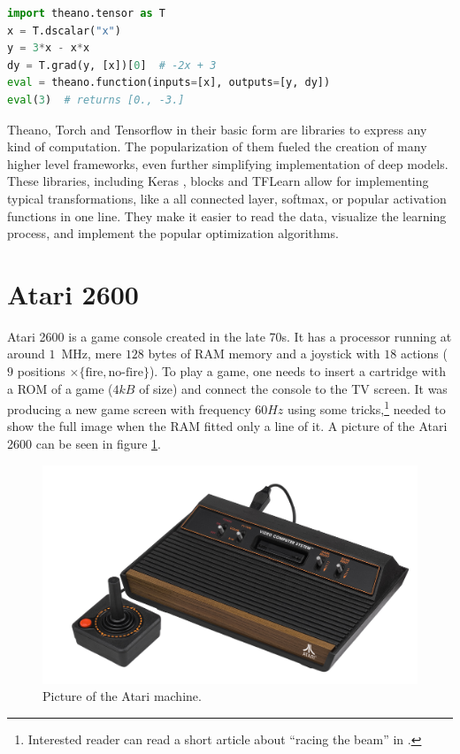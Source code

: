 \begin{lstlisting}[language=Python, caption=Example Theano code.,label={theano-code}
]
import theano.tensor as T
x = T.dscalar("x")
y = 3*x - x*x
dy = T.grad(y, [x])[0]  # -2x + 3
eval = theano.function(inputs=[x], outputs=[y, dy])
eval(3)  # returns [0., -3.]
\end{lstlisting}

Theano, Torch and Tensorflow in their basic form are libraries to express any kind of computation. The popularization of them fueled the creation of many higher level frameworks, even further simplifying implementation of deep models. These libraries, including Keras \cite{keras}, blocks \cite{blocks} and TFLearn \cite{tflearn} allow for implementing typical transformations, like a all connected layer, softmax, or popular activation functions in one line. They make it easier to read the data, visualize the learning process, and implement the popular optimization algorithms.

\section{Atari 2600}
Atari 2600 is a game console created in the late 70s. It has a processor running at around $1$~MHz, mere $128$ bytes of RAM memory and a joystick with $18$ actions ($9$ positions $\times \{\mbox{fire}, \mbox{no-fire}\}$). To play a game, one needs to insert a cartridge with a ROM of a game ($4kB$ of size) and connect the console to the TV screen. It was producing a new game screen with frequency $60Hz$ using some tricks,\footnote{Interested reader can read a short article about ``racing the beam'' in \cite{racing-beam}.} needed to show the full image when the RAM fitted only a line of it. A picture of the Atari 2600 can be seen in figure \ref{atari-picture}.

\begin{figure}
  \centering
  \includegraphics[width=.8\linewidth]{images/atari.jpg}
  \caption{Picture of the Atari machine.}\label{atari-picture}
\end{figure}


